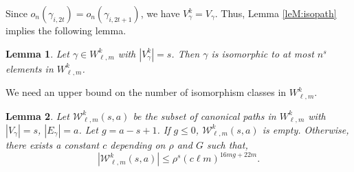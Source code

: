 \documentclass[11pt]{article}
\newtheorem{lemma}{Lemma}
\newcommand{\cE}{E}
\newcommand{\cW}{\mathcal {W}}
\newcommand{\1}{1\!\!{\sf I}}\newcommand{\IND}{\1}
\begin{document}
Since $o_n(\gamma_{i,2t}) = o_n(\gamma_{i,2t+1})$, we have $V^k_\gamma = V_\gamma$. Thus, Lemma \ref{leM:isopath} implies the following lemma.

\begin{lemma}\label{leM:isopath0}
Let $\gamma \in  W^k_{\ell,m}$ with $|V^k_\gamma| = s $. Then $\gamma$  is isomorphic to at most 
$
  n^s
$ 
elements in $ W^k_{\ell,m}$.  
\end{lemma}


We need an upper bound on the number of isomorphism classes in $W^k_{\ell,m}$.

\begin{lemma}\label{leM:enumpath0}
Let $\cW^k_{\ell,m} (s,a) $ be the subset of canonical paths in $W^k_{\ell,m}$ with $|V_\gamma| = s$, $|\cE_\gamma |= a$. Let $g = a - s +1$. If $g \leq 0$, $\cW^k_{\ell,m} (s,a)$ is empty. Otherwise, there exists a constant $c$ depending on $\rho$ and $G$ such that, 
$$
| \cW^k_{\ell,m} (s,a) | \leq  \rho^s (c  \ell  m )^{16 m g + 22 m}.
$$
\end{lemma}
\end{document}
